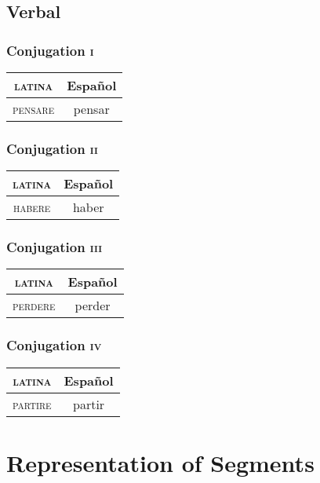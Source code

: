 \documentclass{report}
\begin{document}
\section{Verbal}

\subsection{Conjugation \textsc{i}}

\begin{tabular}{|c|c|}
  \hline
  \textsc{latina} & Español \\
  \hline
  \textsc{pensare} & pensar \\
  \hline
\end{tabular}

\subsection{Conjugation \textsc{ii}}

\begin{tabular}{|c|c|}
  \hline
  \textsc{latina} & Español \\
  \hline
  \textsc{habere} & haber \\
  \hline
\end{tabular}

\subsection{Conjugation \textsc{iii}}

\begin{tabular}{|c|c|}
  \hline
  \textsc{latina} & Español \\
  \hline
  \textsc{perdere} & perder \\
  \hline
\end{tabular}

\subsection{Conjugation \textsc{iv}}

\begin{tabular}{|c|c|}
  \hline
  \textsc{latina} & Español \\
  \hline
  \textsc{partire} & partir \\
  \hline
\end{tabular}

\chapter{Representation of Segments}
\end{document}
